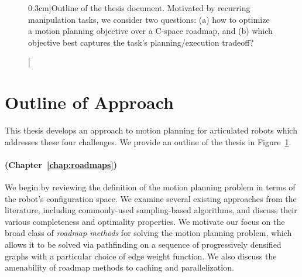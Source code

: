 \begin{figure}[t]
   \caption[][0.3cm]{Outline of the thesis document.
      Motivated by recurring manipulation tasks,
      we consider two questions:
      (a) how to optimize a motion planning objective
      over a C-space roadmap,
      and (b) which objective best captures
      the task's planning/execution tradeoff?}

   \label{fig:intro:outline}
\end{figure}

\section{Outline of Approach}

This thesis develops an approach to motion planning
for articulated robots
which addresses these four challenges.
We provide an outline of the thesis in Figure~\ref{fig:intro:outline}.

\paragraph{ (Chapter~\ref{chap:roadmaps})}
We begin by reviewing the definition of the motion planning problem
in terms of the robot's configuration space.
We examine several existing approaches from the literature,
including commonly-used sampling-based algorithms,
and discuss their various completeness and optimality properties.
We motivate our focus on the broad class of \emph{roadmap methods}
for solving the motion planning problem,
which allows it to be solved via pathfinding on a sequence of
progressively densified graphs
with a particular choice of edge weight function.
We also discuss the amenability of roadmap methods
to caching and parallelization.

